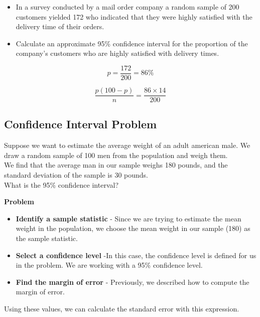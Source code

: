 \documentclass[]{report}
\begin{document}
\begin{itemize}
\item In a survey conducted by a mail order company a random sample of 200 customers yielded 172 who indicated that they 
were highly satisfied with the delivery time of their orders. 

\item Calculate an approximate 95\% confidence interval for the proportion of the company's customers who are 
highly satisfied with delivery times.
\end{itemize}


\[p= \frac{172}{200}= 86\%\]


\[ \frac{p(100-p)}{n} =\frac{86 \times 14}{200}\]



\subsection{Confidence Interval Problem}

Suppose we want to estimate the average weight of an adult american male. We draw a random sample of 100 men from the population  and weigh them.\\ \vspace{0.3cm} We find that the average man in our sample weighs 180 pounds, and the standard deviation of the sample is 30 pounds.\\ What is the 95\% confidence interval?



\noindent  \textbf{Problem}

\begin{itemize}
\item
\textbf{Identify a sample statistic} - Since we are trying to estimate the mean weight in the population, we choose the mean weight in our sample (180) as the sample statistic.


\item \textbf{Select a confidence level}  -In this case, the confidence level is defined for us in the problem. We are working with a 95\% confidence level.


\item \textbf{Find the margin of error} - Previously, we described how to compute the margin of error.
\end{itemize}





Using these values, we can calculate the standard error with this expression.
\end{document}
